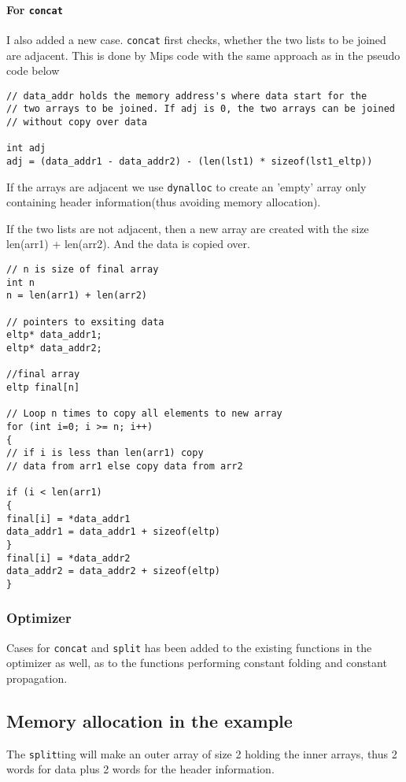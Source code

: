 \documentclass[11pt,a4paper]{article}
\begin{document}
\paragraph{For \texttt{concat}} I also added a new case. \texttt{concat} first
checks, whether the two lists to be joined are adjacent. This is done by Mips
code with the same approach as in the pseudo code below
\begin{lstlisting}
// data_addr holds the memory address's where data start for the
// two arrays to be joined. If adj is 0, the two arrays can be joined
// without copy over data

int adj
adj = (data_addr1 - data_addr2) - (len(lst1) * sizeof(lst1_eltp))
\end{lstlisting}
If the arrays are adjacent we use \texttt{dynalloc} to create an 'empty'
array only containing header information(thus avoiding memory allocation).

If the two lists are not adjacent, then a new array are created with the size
len(arr1) + len(arr2). And the data is copied over.
\begin{lstlisting}
// n is size of final array
int n
n = len(arr1) + len(arr2)

// pointers to exsiting data
eltp* data_addr1;
eltp* data_addr2;

//final array
eltp final[n]

// Loop n times to copy all elements to new array
for (int i=0; i >= n; i++)
{
// if i is less than len(arr1) copy 
// data from arr1 else copy data from arr2

if (i < len(arr1)
{
final[i] = *data_addr1
data_addr1 = data_addr1 + sizeof(eltp) 
}
final[i] = *data_addr2
data_addr2 = data_addr2 + sizeof(eltp) 
}
\end{lstlisting}

\subsubsection{Optimizer}
Cases for \texttt{concat} and \texttt{split} has been added to the existing functions in the optimizer as
well, as to the functions performing constant folding and constant propagation.

\subsection{Memory allocation in the example}
The \texttt{split}ting will make an outer array of size 2 holding the inner
arrays, thus 2 words for data plus 2 words for the header information.
\end{document}
